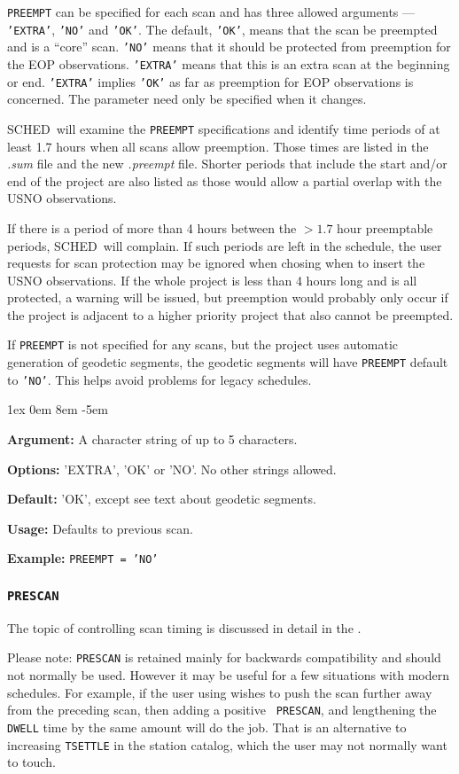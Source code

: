 \documentclass{report}
\newcommand{\schedb}{{\sc SCHED~}}
\newcommand{\rcwbox}[5]{
  \begin{list}{}{\parsep 1ex  \itemsep 0em
                 \leftmargin 8em  \itemindent -5em }
    \item {\bf Argument:} #1
    \item {\bf Options:}  #2
    \item {\bf Default:}  #3
    \item {\bf Usage:}    #4
    \item {\bf Example:}  #5
  \end{list}
}
\begin{document}
{\tt PREEMPT} can be specified for each scan and has three allowed
arguments --- {\tt 'EXTRA'}, {\tt 'NO'} and {\tt 'OK'}.  The default,
{\tt 'OK'}, means that the scan be preempted and is a ``core'' scan.
{\tt 'NO'} means that it should be protected from preemption for the
EOP observations.  {\tt 'EXTRA'} means that this is an extra scan at
the beginning or end.  {\tt 'EXTRA'} implies {\tt 'OK'} as far as
preemption for EOP observations is concerned.  The parameter need only
be specified when it changes.

\schedb will examine the {\tt PREEMPT} specifications and identify
time periods of at least 1.7 hours when all scans allow preemption.
Those times are listed in the {\sl .sum} file and the new {\sl .preempt}
file.  Shorter periods that include the start and/or end of the project
are also listed as those would allow a partial overlap with the USNO
observations.

If there is a period of more than 4 hours between the $>1.7$ hour
preemptable periods, \schedb will complain.  If such periods are left
in the schedule, the user requests for scan protection may be ignored
when chosing when to insert the USNO observations.  If the whole project
is less than 4 hours long and is all protected, a warning will be
issued, but preemption would probably only occur if the project is
adjacent to a higher priority project that also cannot be preempted.

If {\tt PREEMPT} is not specified for any scans, but the project
uses automatic generation of geodetic segments, the geodetic segments
will have {\tt PREEMPT} default to {\tt 'NO'}.  This helps avoid
problems for legacy schedules.

\rcwbox
{A character string of up to 5 characters.}
{'EXTRA', 'OK' or 'NO'.  No other strings allowed.}
{'OK', except see text about geodetic segments.}
{Defaults to previous scan.}
{{\tt PREEMPT = 'NO'}}


\subsubsection{\label{MP:PRESCAN}{\tt PRESCAN}}

The topic of controlling scan timing is discussed in detail in
the .

Please note: {\tt PRESCAN} is retained mainly for backwards
compatibility and should not normally be used.  However it may be
useful for a few situations with modern schedules.  For example, if
the user using  wishes to push the scan
further away from the preceding scan, then adding a positive {\tt
PRESCAN}, and lengthening the {\tt DWELL} time by the same amount will
do the job.  That is an alternative to increasing {\tt TSETTLE} in the
station catalog, which the user may not normally want to touch.
\end{document}
